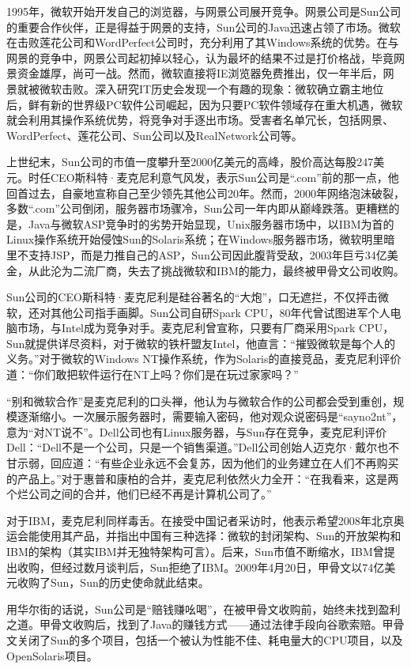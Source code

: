 \documentclass[
  letterpaper,
  DIV=11,
  numbers=noendperiod]{scrreprt}
\begin{document}
1995年，微软开始开发自己的浏览器，与网景公司展开竞争。网景公司是Sun公司的重要合作伙伴，正是得益于网景的支持，Sun公司的Java迅速占领了市场。微软在击败莲花公司和WordPerfect公司时，充分利用了其Windows系统的优势。在与网景的竞争中，网景公司起初掉以轻心，认为最坏的结果不过是打价格战，毕竟网景资金雄厚，尚可一战。然而，微软直接将IE浏览器免费推出，仅一年半后，网景就被微软击败。深入研究IT历史会发现一个有趣的现象：微软确立霸主地位后，鲜有新的世界级PC软件公司崛起，因为只要PC软件领域存在重大机遇，微软就会利用其操作系统优势，将竞争对手逐出市场。受害者名单冗长，包括网景、WordPerfect、莲花公司、Sun公司以及RealNetwork公司等。

上世纪末，Sun公司的市值一度攀升至2000亿美元的高峰，股价高达每股247美元。时任CEO斯科特·麦克尼利意气风发，表示Sun公司是``.com''前的那一点，他回首过去，自豪地宣称自己至少领先其他公司20年。然而，2000年网络泡沫破裂，多数``.com''公司倒闭，服务器市场骤冷，Sun公司一年内即从巅峰跌落。更糟糕的是，Java与微软ASP竞争时的劣势开始显现，Unix服务器市场中，以IBM为首的Linux操作系统开始侵蚀Sun的Solaris系统；在Windows服务器市场，微软明里暗里不支持JSP，而是力推自己的ASP，Sun公司因此腹背受敌，2003年巨亏34亿美金，从此沦为二流厂商，失去了挑战微软和IBM的能力，最终被甲骨文公司收购。

Sun公司的CEO斯科特·麦克尼利是硅谷著名的``大炮''，口无遮拦，不仅抨击微软，还对其他公司指手画脚。Sun公司自研Spark
CPU，80年代曾试图进军个人电脑市场，与Intel成为竞争对手。麦克尼利曾宣称，只要有厂商采用Spark
CPU，Sun就提供详尽资料，对于微软的铁杆盟友Intel，他直言：``摧毁微软是每个人的义务。''对于微软的Windows
NT操作系统，作为Solaris的直接竞品，麦克尼利评价道：``你们敢把软件运行在NT上吗？你们是在玩过家家吗？''

``别和微软合作''是麦克尼利的口头禅，他认为与微软合作的公司都会受到重创，规模逐渐缩小。一次展示服务器时，需要输入密码，他对观众说密码是``sayno2nt''，意为``对NT说不''。Dell公司也有Linux服务器，与Sun存在竞争，麦克尼利评价Dell：``Dell不是一个公司，只是一个销售渠道。''Dell公司创始人迈克尔·戴尔也不甘示弱，回应道：``有些企业永远不会复苏，因为他们的业务建立在人们不再购买的产品上。''对于惠普和康柏的合并，麦克尼利依然火力全开：``在我看来，这是两个烂公司之间的合并，他们已经不再是计算机公司了。''

对于IBM，麦克尼利同样毒舌。在接受中国记者采访时，他表示希望2008年北京奥运会能使用其产品，并指出中国有三种选择：微软的封闭架构、Sun的开放架构和IBM的架构（其实IBM并无独特架构可言）。后来，Sun市值不断缩水，IBM曾提出收购，但经过数月谈判后，Sun拒绝了IBM。2009年4月20日，甲骨文以74亿美元收购了Sun，Sun的历史使命就此结束。

用华尔街的话说，Sun公司是``赔钱赚吆喝''，在被甲骨文收购前，始终未找到盈利之道。甲骨文收购后，找到了Java的赚钱方式------通过法律手段向谷歌索赔。甲骨文关闭了Sun的多个项目，包括一个被认为性能不佳、耗电量大的CPU项目，以及OpenSolaris项目。
\end{document}
